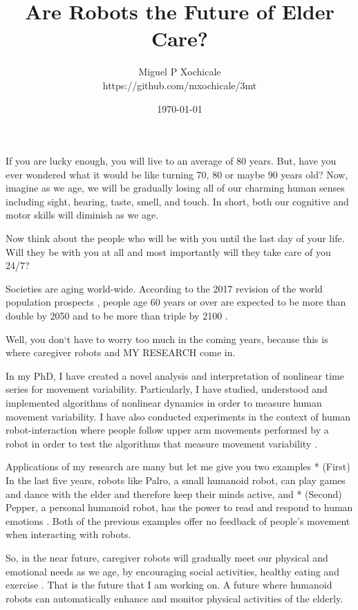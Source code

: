 \documentclass[12pt]{article}
\title{ Are Robots the Future of Elder Care?  }
\author{Miguel P Xochicale \\
https://github.com/mxochicale/3mt}
\date{\today}
\begin{document}
\maketitle

If you are lucky enough, you will live to an average of 80 years.
But, have you ever wondered what it would be like turning 70, 80 or maybe 90 years old?
Now, imagine as we age, we will be gradually losing all of our
charming human senses including sight, hearing, taste, smell, and touch.
In short, both our cognitive and motor skills will diminish as we age.

Now think about the people who will be with you until the last day of your life.
Will they be with you at all 
and most importantly will they take care of you 24/7?

Societies are aging world-wide.
According to the 2017 revision of the world population prospects \cite{un2017}, 
people age 60 years or over
are expected to be more than double by 2050 and to be more than triple by 2100 \cite{unb2017}.

Well, you don`t have to worry too much in the coming years, 
because this is where caregiver robots and MY RESEARCH come in.

In my PhD, 
I have created a novel analysis and interpretation of nonlinear time series
for movement variability.
Particularly,
I have studied, understood and implemented algorithms of nonlinear dynamics
in order to measure human movement variability.
I have also conducted experiments in the context of human robot-interaction 
where people follow upper arm movements performed by a robot 
in order to test the algorithms that measure movement variability \cite{xochicale2018}.

Applications of my research are many but let me give you two examples
* (First) In the last five years, 
robots like Palro, a small humanoid robot, can play games and dance with the elder
and therefore keep their minds active, and
* (Second) Pepper, a personal humanoid robot,  has the power 
to read and respond to human emotions \cite{hay2015}.
Both of the previous examples offer no feedback of people's movement when 
interacting with robots.

So, in the near future, caregiver robots will gradually meet our physical and emotional needs as we age, 
by encouraging social activities, healthy eating and exercise \cite{aronson2014}.
That is the future that I am working on.
A future where humanoid robots can automatically enhance and monitor physical activities of the elderly.
\end{document}
